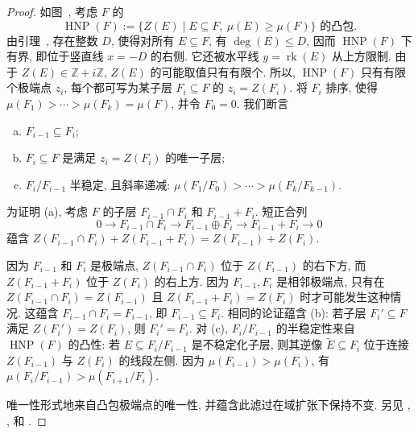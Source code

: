 \begin{proof}
如图~, 考虑 $F$ 的
\[
\operatorname{HNP}(F):=\{Z(E)\mid E\subseteq F,\ \mu(E)\geq\mu(F)\}\text{ 的凸包}.
\]
由引理~, 存在整数 $D$, 使得对所有 $E\subseteq F$, 有 $\deg(E)\leq D$, 因而 $\operatorname{HNP}(F)$ 下有界, 即位于竖直线 $x=-D$ 的右侧. 它还被水平线 $y=\operatorname{rk}(E)$ 从上方限制. 由于 $Z(E)\in\mathbb Z+i\mathbb Z$, $Z(E)$ 的可能取值只有有限个. 所以, $\operatorname{HNP}(F)$ 只有有限个极端点 $z_i$, 每个都可写为某子层 $F_i\subseteq F$ 的 $z_i=Z(F_i)$. 将 $F_i$ 排序, 使得 $\mu(F_1)>\cdots>\mu(F_k)=\mu(F)$, 并令 $F_0=0$. 我们断言
\begin{enumerate}[(a)]
\item $F_{i-1}\subseteq F_i$;
\item $F_i\subseteq F$ 是满足 $z_i=Z(F_i)$ 的唯一子层;
\item $F_i/F_{i-1}$ 半稳定, 且斜率递减: $\mu(F_1/F_0)>\cdots>\mu(F_k/F_{k-1})$.
\end{enumerate}
为证明 (a), 考虑 $F$ 的子层 $F_{i-1}\cap F_i$ 和 $F_{i-1}+F_i$. 短正合列
\[
0\to F_{i-1}\cap F_i\to F_{i-1}\oplus F_i\to F_{i-1}+F_i\to0
\]
蕴含 $Z(F_{i-1}\cap F_i)+Z(F_{i-1}+F_i)=Z(F_{i-1})+Z(F_i)$.
\begin{center}
\end{center}
因为 $F_{i-1}$ 和 $F_i$ 是极端点, $Z(F_{i-1}\cap F_i)$ 位于 $Z(F_{i-1})$ 的右下方, 而 $Z(F_{i-1}+F_i)$ 位于 $Z(F_i)$ 的右上方. 因为 $F_{i-1},F_i$ 是相邻极端点, 只有在 $Z(F_{i-1}\cap F_i)=Z(F_{i-1})$ 且 $Z(F_{i-1}+F_i)=Z(F_i)$ 时才可能发生这种情况. 这蕴含 $F_{i-1}\cap F_i=F_{i-1}$, 即 $F_{i-1}\subseteq F_i$. 相同的论证蕴含 (b): 若子层 $F_i'\subseteq F$ 满足 $Z(F_i')=Z(F_i)$, 则 $F_i'=F_i$. 对 (c), $F_i/F_{i-1}$ 的半稳定性来自 $\operatorname{HNP}(F)$ 的凸性: 若 $E\subseteq F_i/F_{i-1}$ 是不稳定化子层, 则其逆像 $\widetilde E\subseteq F_i$ 位于连接 $Z(F_{i-1})$ 与 $Z(F_i)$ 的线段左侧. 因为 $\mu(F_{i-1})>\mu(F_i)$, 有 $\mu(F_i/F_{i-1})>\mu(F_{i+1}/F_i)$.

唯一性形式地来自凸包极端点的唯一性, 并蕴含此滤过在域扩张下保持不变. 另见 \cite[引理 1.3.7]{HN75}, \cite[命题 5.4.2]{LP97}, \cite[定理 1.3.4]{HL10} 和 \cite[\S2]{Bay11}.
\end{proof}
